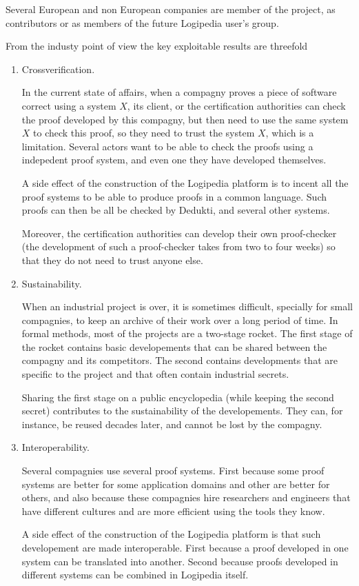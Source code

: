 Several European and non European companies are member of the project,
as contributors or as members of the future {\sc Logipedia} user's group.

From the industy point of view the key exploitable results are threefold

\begin{enumerate}
\item Crossverification.

In the current state of affairs, when a compagny proves a piece of
software correct using a system $X$, its client, or the certification
authorities can check the proof developed by this compagny, but then
need to use the same system $X$ to check this proof, so they need to
trust the system $X$, which is a limitation. Several actors want to be
able to check the proofs using a indepedent proof system, and even one
they have developed themselves.

A side effect of the construction of the {\sc Logipedia} platform is
to incent all the proof systems to be able to produce proofs in a
common language. Such proofs can then be all be checked by {\sc
Dedukti}, and several other systems.

Moreover, the certification authorities can develop their own
proof-checker (the development of such a proof-checker takes from two
to four weeks) so that they do not need to trust anyone else.

\item Sustainability.

When an industrial project is over, it is sometimes difficult,
specially for small compagnies, to keep an archive of their work over
a long period of time. In formal methods, most of the projects are a
two-stage rocket. The first stage of the rocket contains basic
developements that can be shared between the compagny and its
competitors. The second contains developments that are specific to the
project and that often contain industrial secrets.

Sharing the first stage on a public encyclopedia (while keeping the
second secret) contributes to the sustainability of the
developements. They can, for instance, be reused decades later, and
cannot be lost by the compagny.

\item Interoperability.

Several compagnies use several proof systems. First because some proof
systems are better for some application domains and other are better
for others, and also because these compagnies hire researchers and
engineers that have different cultures and are more efficient using the
tools they know.

A side effect of the construction of the {\sc Logipedia} platform is
that such developement are made interoperable. First because a proof
developed in one system can be translated into another. Second because
proofs developed in different systems can be combined in {\sc
Logipedia} itself.
\end{enumerate}

